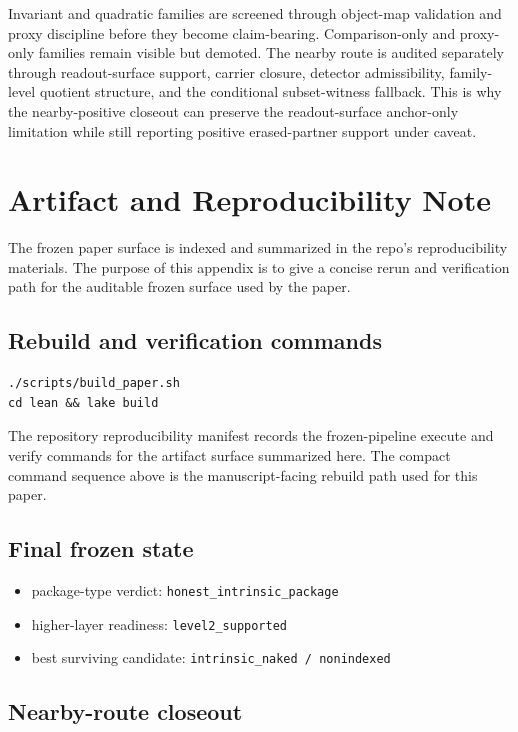 \documentclass[11pt]{article}
\theoremstyle{definition}
\begin{document}
Invariant and quadratic families are screened through object-map validation and proxy discipline before they become claim-bearing. Comparison-only and proxy-only families remain visible but demoted. The nearby route is audited separately through readout-surface support, carrier closure, detector admissibility, family-level quotient structure, and the conditional subset-witness fallback. This is why the nearby-positive closeout can preserve the readout-surface anchor-only limitation while still reporting positive erased-partner support under caveat.
 \section{Artifact and Reproducibility Note}
\label{app:repro}

The frozen paper surface is indexed and summarized in the repo's reproducibility materials. The purpose of this appendix is to give a concise rerun and verification path for the auditable frozen surface used by the paper.

\subsection*{Rebuild and verification commands}

\begin{verbatim}
./scripts/build_paper.sh
cd lean && lake build
\end{verbatim}

The repository reproducibility manifest records the frozen-pipeline execute and
verify commands for the artifact surface summarized here. The compact command
sequence above is the manuscript-facing rebuild path used for this paper.

\subsection*{Final frozen state}

\begin{itemize}
\item package-type verdict: \texttt{honest\_intrinsic\_package}
\item higher-layer readiness: \texttt{level2\_supported}
\item best surviving candidate: \texttt{intrinsic\_naked / nonindexed}
\end{itemize}

\subsection*{Nearby-route closeout}
\end{document}
